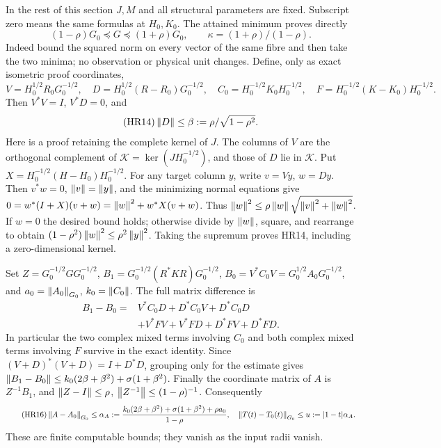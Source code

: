 In the rest of this section \(J,M\) and all structural parameters
are fixed. Subscript zero means the same formulas at \(H_0,K_0\).
The attained minimum proves directly
\begin{equation}\tag{HR13}\label{hrv:HR13}
(1-\rho)G_0\preceq G\preceq(1+\rho)G_0,\qquad
\kappa=(1+\rho)/(1-\rho).
\end{equation}
Indeed bound the squared norm on every vector of the same fibre
and then take the two minima; no observation or physical unit changes.
Define, only as exact isometric proof coordinates,
\[
V=H_0^{1/2}R_0G_0^{-1/2},\quad
D=H_0^{1/2}(R-R_0)G_0^{-1/2},\quad
C_0=H_0^{-1/2}K_0H_0^{-1/2},\quad
F=H_0^{-1/2}(K-K_0)H_0^{-1/2}.
\]
Then \(V^*V=I\), \(V^*D=0\), and
\begin{equation}\tag{HR14}\label{hrv:HR14}
\left\lVert D\right\rVert\le\beta:=\rho/\sqrt{1-\rho^2}.
\end{equation}
Here is a proof retaining the complete kernel of \(J\).
The columns of \(V\) are the orthogonal complement of
\(\mathcal K=\ker(JH_0^{-1/2})\), and those of \(D\) lie in \(\mathcal K\).
Put \(X=H_0^{-1/2}(H-H_0)H_0^{-1/2}\). For any target column \(y\),
write \(v=Vy\), \(w=Dy\). Then \(v^*w=0\), \(\left\lVert v\right\rVert=\left\lVert y\right\rVert\),
and the minimizing normal equations give
\(0=w^*(I+X)(v+w)=\left\lVert w\right\rVert^2+w^*X(v+w)\).
Thus \(\left\lVert w\right\rVert^2\le\rho\left\lVert w\right\rVert\sqrt{\left\lVert v\right\rVert^2+\left\lVert w\right\rVert^2}\).
If \(w=0\) the desired bound holds; otherwise divide by \(\left\lVert w\right\rVert\),
square, and rearrange to obtain
\((1-\rho^2)\left\lVert w\right\rVert^2\le\rho^2\left\lVert y\right\rVert^2\).
Taking the supremum proves HR14, including a zero-dimensional kernel.

Set \(Z=G_0^{-1/2}GG_0^{-1/2}\),
\(B_1=G_0^{-1/2}(R^*KR)G_0^{-1/2}\),
\(B_0=V^*C_0V=G_0^{1/2}A_0G_0^{-1/2}\), and \(a_0=\left\lVert A_0\right\rVert_{G_0}\),
\(k_0=\left\lVert C_0\right\rVert\). The full matrix difference is
\begin{equation}\tag{HR15}\label{hrv:HR15}
\begin{split}
B_1-B_0={}&V^*C_0D+D^*C_0V+D^*C_0D\\
&+V^*FV+V^*FD+D^*FV+D^*FD.
\end{split}
\end{equation}
In particular the two complex mixed terms involving \(C_0\) and both
complex mixed terms involving \(F\) survive in the exact identity.
Since \((V+D)^*(V+D)=I+D^*D\), grouping only for the estimate gives
\(\left\lVert B_1-B_0\right\rVert\le k_0(2\beta+\beta^2)+\sigma(1+\beta^2)\).
Finally the coordinate matrix of \(A\) is \(Z^{-1}B_1\), and
\(\left\lVert Z-I\right\rVert\le\rho\), \(\left\lVert Z^{-1}\right\rVert\le(1-\rho)^{-1}\).
Consequently
\begin{equation}\tag{HR16}\label{hrv:HR16}
\left\lVert A-A_0\right\rVert_{G_0}\le
\alpha_A:=\frac{k_0(2\beta+\beta^2)+\sigma(1+\beta^2)+\rho a_0}
{1-\rho},\quad
\left\lVert T(t)-T_0(t)\right\rVert_{G_0}\le u:=|1-t|\alpha_A.
\end{equation}
These are finite computable bounds; they vanish as the input radii vanish.

